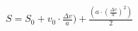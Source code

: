 \documentclass[preview]{standalone}
\begin{document}
\begin{align*}
S = S_{0} + v_{0} \cdot \frac{\Delta v}{a}) + \frac{(a \cdot (\frac{\Delta v}{a})^2)}{2}
\end{align*}
\end{document}
